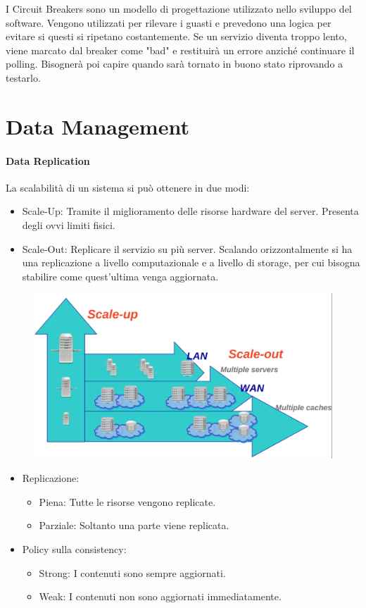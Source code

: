 \documentclass{article}
\begin{document}
		I Circuit Breakers sono un modello di progettazione utilizzato nello sviluppo del software. Vengono utilizzati per rilevare i guasti e prevedono una logica per evitare si questi si ripetano costantemente.
		Se un servizio diventa troppo lento, viene marcato dal breaker come "bad" e restituirà un errore anziché continuare il polling. Bisognerà poi capire quando sarà tornato in buono stato riprovando a testarlo.\\
		
		\newpage
		\section{Data Management}
		\paragraph{Data Replication}
		
		La scalabilità di un sistema si può ottenere in due modi:
		\begin{itemize}
			\item Scale-Up: Tramite il miglioramento delle risorse hardware del server. Presenta degli ovvi limiti fisici.
			\item Scale-Out: Replicare il servizio su più server. Scalando orizzontalmente si ha una replicazione a livello computazionale e a livello di storage, per cui bisogna stabilire come quest'ultima venga aggiornata.
		\end{itemize}
		\begin{figure}[ht]
			\centering
			\includegraphics[width=0.65\linewidth]{SAC_A5_scaling}
			\label{fig:saca5scaling}
		\end{figure}
		
		\begin{itemize}
		    \item Replicazione:
		    \begin{itemize}
		        \item Piena: Tutte le risorse vengono replicate.
		        \item Parziale: Soltanto una parte viene replicata.
		    \end{itemize}
		    \item Policy sulla consistency: \begin{itemize}
		        \item Strong: I contenuti sono sempre aggiornati.
		        \item Weak: I contenuti non sono aggiornati immediatamente.
		    \end{itemize}
		\end{itemize}
		
\end{document}
